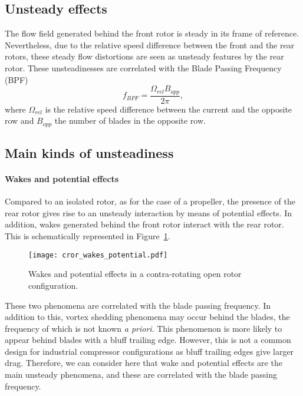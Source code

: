 
\subsection{Unsteady effects}
\label{sub:cror_from_steady_to_unsteady_phenomena}

The flow field generated behind the front rotor
is steady in its frame of reference. Nevertheless,
due to the relative speed difference between the
front and the rear rotors, these steady flow distortions are
seen as unsteady features by the rear rotor. 
These unsteadinesses are correlated with the Blade Passing Frequency (BPF)
\begin{equation}
	f_{BPF} = \frac{\Omega_{rel} B_{opp}}{2 \pi},
\end{equation}
where $\Omega_{rel}$ is the relative speed difference between
the current and the opposite row
and $B_{opp}$ the number of blades in the opposite row.

\subsection{Main kinds of unsteadiness}
\label{sub:cror_main_unsteadinesses}

\paragraph{Wakes and potential effects}

Compared to an isolated rotor, as for the case of a propeller,
the presence of the rear rotor gives rise to an unsteady
interaction by means of potential effects. In addition, wakes generated
behind the front rotor interact with the rear rotor.
This is schematically represented in Figure~\ref{fig:cror_wakes_potential}.
\begin{figure}[htp]
  \centering
  \texttt{[image: cror\_wakes\_potential.pdf]}
  \caption{Wakes and potential effects in a 
  contra-rotating open rotor configuration.}
  \label{fig:cror_wakes_potential}
\end{figure}
These two phenomena are correlated with the blade passing frequency.
In addition to this, vortex shedding phenomena may occur behind the blades, 
the frequency of which is not known \emph{a priori}.
This phenomenon is more likely to appear behind blades with a bluff trailing edge.
However, this is not a common design for industrial compressor 
configurations as bluff trailing edges
give larger drag. Therefore, we can consider here that 
wake and potential effects are the main unsteady phenomena,
and these are correlated with the blade passing frequency.

